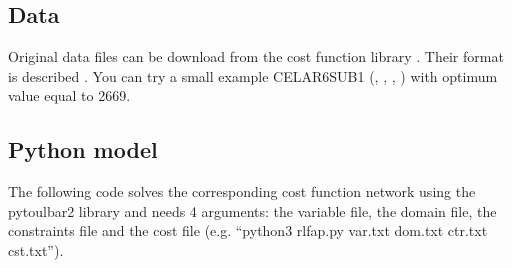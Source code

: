 \documentclass[letterpaper,10pt,openany,oneside,english]{sphinxmanual}
\begin{document}
\subsection{Data}
\label{\detokenize{examples/tuto_rlfap:data}}
\sphinxAtStartPar
Original data files can be download from the cost function library . Their format is described . You can try a small example CELAR6\sphinxhyphen{}SUB1 (, , , ) with optimum value equal to 2669.


\subsection{Python model}
\label{\detokenize{examples/tuto_rlfap:python-model}}
\sphinxAtStartPar
The following code solves the corresponding cost function network using the pytoulbar2 library and needs 4 arguments: the variable file, the domain file, the constraints file and the cost file (e.g. “python3 rlfap.py var.txt dom.txt ctr.txt cst.txt”).

\sphinxAtStartPar
{}
\end{document}
